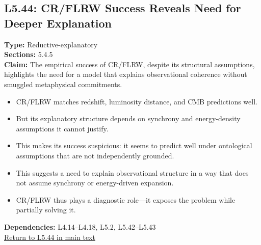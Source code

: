 \documentclass[12pt]{book}
\newcommand{\returnlink}[1]{\hyperref[logic:#1]{Return to #1 in main text}\xspace}
\begin{document}
\subsection*{L5.44: CR/FLRW Success Reveals Need for Deeper Explanation}
\label{appendix:L5.44}
\textbf{Type:} Reductive-explanatory \\
\textbf{Sections:} 5.4.5 \\
\textbf{Claim:} The empirical success of CR/FLRW, despite its structural assumptions, highlights the need for a model that explains observational coherence without smuggled metaphysical commitments.
\begin{itemize}
  \item CR/FLRW matches redshift, luminosity distance, and CMB predictions well.
  \item But its explanatory structure depends on synchrony and energy-density assumptions it cannot justify.
  \item This makes its success suspicious: it seems to predict well under ontological assumptions that are not independently grounded.
  \item This suggests a need to explain observational structure in a way that does not assume synchrony or energy-driven expansion.
  \item CR/FLRW thus plays a diagnostic role---it exposes the problem while partially solving it.
\end{itemize}
\textbf{Dependencies:} L4.14–L4.18, L5.2, L5.42–L5.43 \\
\returnlink{L5.44}
\end{document}
